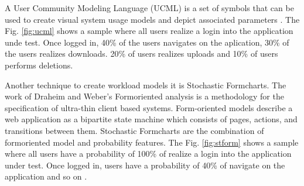 \documentclass{report}
\begin{document}
A User Community Modeling Language (UCML) is a set of symbols that can be used to create visual system usage models and depict associated parameters \cite{Wang2013}. The Fig. \ref{fig:ucml} shows a sample where all users realize a login into the application unde test. Once logged in, 40\% of the users navigates on the aplication, 30\%  of the users realizes downloads. 20\% of users realizes uploads and 10\% of users performs deletions.





Another technique to create workload models it is Stochastic Formcharts. The work of Draheim and Weber’s Formoriented analysis is a methodology for the specification of ultra-thin client based systems. Form-oriented models describe a web application as a bipartite state machine which consists of pages, actions, and transitions between them. Stochastic Formcharts are the combination of formoriented model and probability features. The Fig. \ref{fig:stform} shows a sample where all users have a probability of 100\% of realize a login into the application under test. Once logged in, users have a probability of 40\% of navigate on the application and so on \cite{Draheim2006b}.
\end{document}
